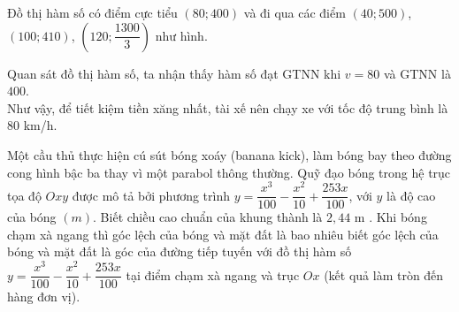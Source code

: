 \begin{bt}
{\begin{center}
		\end{center}
		Đồ thị hàm số có điểm cực tiểu $\left(80;400\right)$ và đi qua các điểm $\left(40;500\right)$,  $\left(100;410\right)$, $\left(120;\dfrac{1300}{3}\right)$ như hình.\\
		\begin{center}
		\end{center}
		Quan sát đồ thị hàm số, ta nhận thấy hàm số đạt GTNN khi $v=80$ và  GTNN là $400$.\\
	Như vậy, để tiết kiệm tiền xăng  nhất, tài xế nên chạy xe với tốc độ trung bình là $80$ km/h.}
\end{bt}

\begin{bt}%
	Một cầu thủ thực hiện cú sút bóng xoáy (banana kick), làm bóng bay  theo đường cong hình bậc ba thay vì một parabol thông thường. Quỹ đạo bóng trong hệ trục tọa độ $ Oxy $ được mô tả bởi phương trình $ y=\dfrac{x^{3}}{100}-\dfrac{x^{2}}{10}+\dfrac{253 x}{100} $, với $ y $ là độ cao của bóng $ (m) $. Biết chiều cao chuẩn của khung thành là $2{,}44$ m . Khi bóng chạm xà ngang thì góc lệch của bóng và mặt đất là bao nhiêu biết góc lệch của bóng và mặt đất là góc của đường tiếp tuyến với đồ thị hàm số $ y=\dfrac{x^{3}}{100}-\dfrac{x^{2}}{10}+\dfrac{253 x}{100} $ tại điểm chạm xà ngang và trục $ Ox $ (kết quả làm tròn đến hàng đơn vị).
\end{bt}

